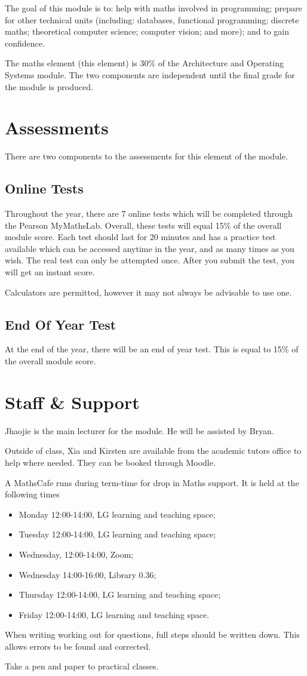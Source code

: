 
The goal of this module is to: help with maths involved in programming; prepare for other technical units (including: databases, functional programming; discrete maths; theoretical computer science; computer vision; and more); and to gain confidence.

The maths element (this element) is 30\% of the Architecture and Operating Systems module. The two components are independent until the final grade for the module is produced.

\section*{Assessments}
There are two components to the assessments for this element of the module.
\subsection*{Online Tests}
Throughout the year, there are 7 online tests which will be completed through the Pearson MyMathsLab. Overall, these tests will equal 15\% of the overall module score. Each test should last for 20 minutes and has a practice test available which can be accessed anytime in the year, and as many times as you wish. The real test can only be attempted once. After you submit the test, you will get an instant score.

Calculators are permitted, however it may not always be advisable to use one.

\subsection*{End Of Year Test}
At the end of the year, there will be an end of year test. This is equal to 15\% of the overall module score.

\section*{Staff \& Support}
Jhaojie is the main lecturer for the module. He will be assisted by Bryan.

Outside of class, Xia and Kirsten are available from the academic tutors office to help where needed. They can be booked through Moodle.

A MathsCafe runs during term-time for drop in Maths support. It is held at the following times
\begin{itemize}
    \item Monday 12:00-14:00, LG learning and teaching space;
    \item Tuesday 12:00-14:00, LG learning and teaching space;
    \item Wednesday, 12:00-14:00, Zoom;
    \item Wednesday 14:00-16:00, Library 0.36;
    \item Thursday 12:00-14:00, LG learning and teaching space;
    \item Friday 12:00-14:00, LG learning and teaching space.
\end{itemize}


When writing working out for questions, full steps should be written down. This allows errors to be found and corrected.

Take a pen and paper to practical classes.
